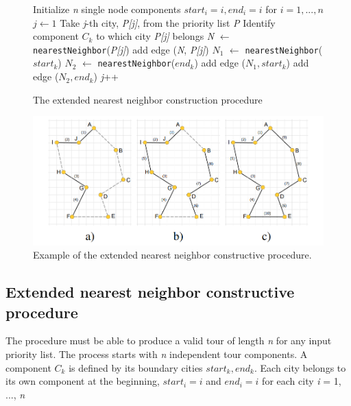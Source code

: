 \documentclass[twoside]{ctuthesis}
\theoremstyle{plain}
\theoremstyle{definition}
\theoremstyle{note}
\begin{document}
\begin{figure}
\begin{algorithmic}[1]
\State Initialize \emph{n} single node components \emph{$ start_i = i, end_i = i $} for \emph{$ i = 1, ..., n $}
\State $j \gets 1$
\Do
\State Take \emph{j}-th city, \emph{P[j]}, from the priority list \emph{P}
\State Identify component \emph{$ C_k $} to which city \emph{P[j]} belongs
\State \emph{N} $\gets$ {\tt nearestNeighbor}(\emph{P[j]})
\State add edge (\emph{N}, \emph{P[j]})
\Else
\State \emph{$ N_1 $} $\gets$ {\tt nearestNeighbor}(\emph{$ start_k $})
\State \emph{$ N_2 $} $\gets$ {\tt nearestNeighbor}(\emph{$ end_k $})
\State add edge (\emph{$ N_1, start_k $})
\Else
\State add edge (\emph{$ N_2, end_k $})
\EndIf
\EndIf
\State \emph{j}++

\end{algorithmic}
	\caption{The extended nearest neighbor construction procedure}
	\label{fig:cnnptsp}
\end{figure}

\begin{figure}
	\includegraphics[width=\linewidth]{tspexample.png}
	\caption{Example of the extended nearest neighbor constructive
		procedure.}
	\label{fig:tsp}
\end{figure}


\subsection{Extended nearest neighbor constructive procedure}
The procedure must be able to produce a valid tour of length \emph{n} for any input priority list.
The process starts with \emph{n} independent tour components. A component \emph{$ C_k $} is defined by its boundary cities {\emph{$ start_k, end_k $}}. Each city belongs to its own component at the beginning, \emph{$ start_i = i $} and \emph{$ end_i = i  $} for each city \emph{i} = 1, ..., \emph{n}
\end{document}
